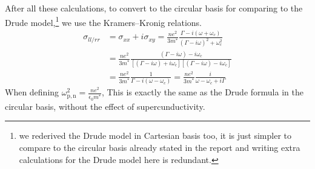 After all these calculations, to convert to the circular basis for comparing to the Drude
model,\footnote{we rederived the Drude model in Cartesian basis too, it is just simpler to compare
to the circular basis already stated in the report and writing extra calculations for the Drude
model here is redundant.} we use the Kramers--Kronig relations.
\begin{align}
    \sigma_{ll/rr} &= \sigma_{xx} + i\sigma_{xy} = \frac{n e^2}{3m^*}
    \frac{\Gamma - i(\omega + \omega_c)}{(\Gamma - i\omega)^2 + \omega_c^2} \\
    &= \frac{n e^2}{3m^*}\frac{(\Gamma - i\omega) - i\omega_c}
    {[(\Gamma - i\omega) + i\omega_c][(\Gamma - i\omega) - i\omega_c]} \\
    &= \frac{n e^2}{3m^*}\frac{1}{\Gamma - i(\omega - \omega_c)} = \frac{n e^2}{3m^*}\frac{i}{\omega - \omega_c + i\Gamma}
\end{align}
When defining $\omega^2_{\mathrm{p,n}} = \frac{ne^2}{\epsilon_0 m^*}$, This is exactly the same as
the Drude formula in the circular basis, without the effect of supercunductivity.
